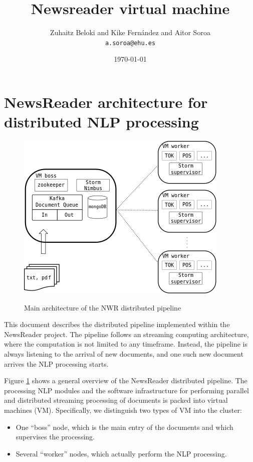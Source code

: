 \documentclass[a4]{article}
\author{Zuhaitz Beloki and  Kike Fernández and Aitor Soroa\\\texttt{a.soroa@ehu.es}}
\date{\today}
\title{Newsreader virtual machine}
\begin{document}
\maketitle
\tableofcontents
\cleardoublepage


\section{NewsReader architecture for distributed NLP processing}
\label{sec:newsr-arch-distr}

\begin{figure}[t]
  \centering
  {\includegraphics[scale=0.5]{lpstageVM14a.png}}  
  \caption{Main architecture of the NWR distributed pipeline}
  \label{fig:main-arch-nwr}
\end{figure}

This document describes the distributed pipeline implemented within the
NewsReader project. The pipeline follows an streaming computing
architecture, where the computation is not limited to any
timeframe. Instead, the pipeline is always listening to the arrival of new
documents, and one such new document arrives the NLP processing starts.

Figure \ref{fig:main-arch-nwr} shows a general overview of the NewsReader
distributed pipeline. The processing NLP modules and the software
infrastructure for performing parallel and distributed streaming processing
of documents is packed into virtual machines (VM). Specifically, we
distinguish two types of VM into the cluster:
\begin{itemize}
\item One ``boss'' node, which is the main entry of the documents and which
  supervises the processing.
\item Several ``worker'' nodes, which actually perform the NLP processing.
\end{itemize}
\end{document}
